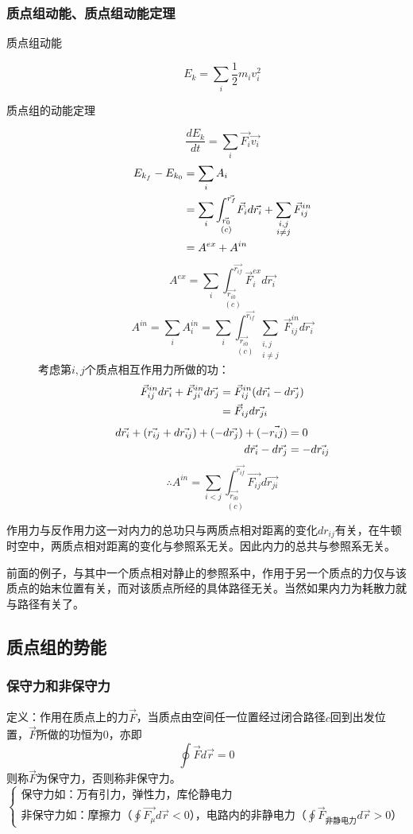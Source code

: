 \subsubsection{质点组动能、质点组动能定理}
\begin{description}
\item[质点组动能]\[E_k=\sum_i \frac{1}{2}m_iv_i^2\]
\item[质点组的动能定理]\[\frac{dE_k}{dt}=\sum_i \vec{F_i}\vec{v_i}\]
\begin{align}
E_{k_f}-E_{k_0}&=\sum_i A_i\notag\\
&= \sum_i \underset{(c)}{\int_{\vec{r_0}}^{\vec{r_f}}} \vec{F_i}d\vec{r_i} + \sum_{\substack{i,j\\i\ne j}}\vec{F}_{ij}^{in}\notag \\
&=A^{ex}+A^{in} \notag
\end{align}
\[A^{ex}=\sum_i \underset{(c)}{\int_{\vec{r_{i0}}}^{\vec{r_{if}}}}\vec{F}_i^{ex}d\vec{r_i}\]
\[A^{in}=\sum_i A_i^{in} = \sum_i\underset{(c)}{\int_{\vec{r_{i0}}}^{\vec{r_{if}}}}\sum_{\substack{i,j\\i\ne j}} \vec{F}_{ij}^{in} d\vec{r_i}\]
考虑第$i,j$个质点相互作用力所做的功：
\begin{align}
\vec{F}_{ij}^{in}d\vec{r_i}+\vec{F}_{ji}^{in}d\vec{r_j} &= \vec{F}_{ij}^{in}(d\vec{r_i}-d\vec{r_j}) \notag\\
&=\vec{F}_{ij}d\vec{r_{ji}}\notag
\end{align}\begin{align}
d\vec{r_i}+(\vec{r_{ij}}+d\vec{r_{ij}})+(-d\vec{r_j})+(-\vec{r_ij})&=0 \notag\\
d\vec{r_i}-d\vec{r_j}&=-d\vec{r_{ij}}\notag
\end{align}
\[\therefore A^{in}=\sum_{i<j}\underset{(c)}{\int_{\vec{r_{i0}}}^{\vec{r_{if}}}}\vec{F_{ij}}d\vec{r_{ji}} \]
\end{description}

作用力与反作用力这一对内力的总功只与两质点相对距离的变化$dr_{ij}$有关，在牛顿时空中，两质点相对距离的变化与参照系无关。因此内力的总共与参照系无关。

前面的例子，与其中一个质点相对静止的参照系中，作用于另一个质点的力仅与该质点的始末位置有关，而对该质点所经的具体路径无关。当然如果内力为耗散力就与路径有关了。
\subsection{质点组的势能}
\subsubsection{保守力和非保守力}
定义：作用在质点上的力$\vec{F}$，当质点由空间任一位置经过闭合路径$c$回到出发位置，$\vec{F}$所做的功恒为$0$，亦即
\[\oint\vec{F} d\vec{r}=0\]
则称$\vec{F}$为保守力，否则称非保守力。
\[\begin{cases}
\text{保守力如：万有引力，弹性力，库伦静电力}\\
\text{非保守力如：摩擦力（$\oint \vec{F_\mu}d\vec{r}<0$），电路内的非静电力（$\oint \vec{F}_\text{非静电力}d\vec{r}>0$）}
\end{cases}\]

